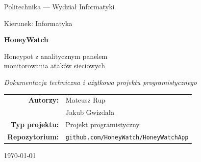 \documentclass[12pt,a4paper]{report}
\begin{document}
\begin{titlepage}
\centering
\thispagestyle{empty}

{\large Politechnika --- Wydział Informatyki\par}
\vspace{0.4cm}
{\large Kierunek: Informatyka\par}

\vfill


\vspace{0.8cm}

{\Huge\bfseries HoneyWatch\par}
\vspace{0.4cm}
{\Large Honeypot z analitycznym panelem\\ monitorowania ataków sieciowych\par}

\vspace{0.6cm}
{\large\itshape Dokumentacja techniczna i użytkowa projektu programistycznego\par}

\vfill

\begin{tabular}{rl}
\textbf{Autorzy:} & Mateusz Rup \\
                  & Jakub Gwizdała \\[6pt]
\textbf{Typ projektu:} & Projekt programistyczny \\[6pt]
\textbf{Repozytorium:} & \texttt{github.com/HoneyWatch/HoneyWatchApp} \\
\end{tabular}

\vspace{1.0cm}
{\large \today\par}

\vfill
\end{titlepage}

\setcounter{page}{1}
\tableofcontents
\listoffigures
\cleardoublepage
{}
\setcounter{page}{1}
\end{document}
